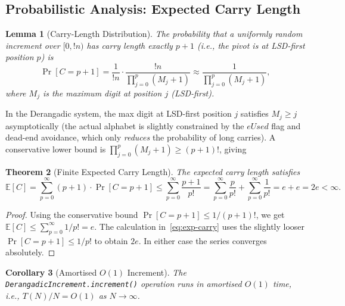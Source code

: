 \documentclass[11pt,a4paper]{article}
\newtheorem{theorem}{Theorem}[section]
\newtheorem{lemma}[theorem]{Lemma}
\newtheorem{corollary}[theorem]{Corollary}
\newcommand{\subfact}[1]{!{#1}} %
\begin{document}
    \subsection{Probabilistic Analysis: Expected Carry Length}

    \begin{lemma}[Carry-Length Distribution]
        \label{lem:carry-dist}
        The probability that a uniformly random increment over $[0, \subfact{n})$
        has carry length exactly $p+1$ (i.e., the pivot is at LSD-first position $p$)
        is
        \begin{equation}
            \Pr[C = p+1] = \frac{1}{\subfact{n}} \cdot
            \frac{\subfact{n}}{\prod_{j=0}^{p} (M_j+1)}
            \approx \frac{1}{\prod_{j=0}^{p} (M_j+1)},
            \label{eq:carry-prob}
        \end{equation}
        where $M_j$ is the maximum digit at position $j$ (LSD-first).
    \end{lemma}

    In the Derangadic system, the max digit at LSD-first position $j$ satisfies
    $M_j \geq j$ asymptotically (the actual alphabet is slightly constrained by
    the $eUsed$ flag and dead-end avoidance, which only \emph{reduces} the
    probability of long carries). A conservative lower bound is
    $\prod_{j=0}^{p} (M_j+1) \geq (p+1)!$, giving

    \begin{theorem}[Finite Expected Carry Length]
        \label{thm:expected-carry}
        The expected carry length satisfies
        \begin{equation}
            \mathbb{E}[C] = \sum_{p=0}^{\infty} (p+1) \cdot \Pr[C = p+1]
            \leq \sum_{p=0}^{\infty} \frac{p+1}{p!}
            = \sum_{p=0}^{\infty} \frac{p}{p!} + \sum_{p=0}^{\infty} \frac{1}{p!}
            = e + e = 2e < \infty.
            \label{eq:exp-carry}
        \end{equation}
    \end{theorem}

    \begin{proof}
        Using the conservative bound $\Pr[C = p+1] \leq 1/(p+1)!$, we get
        $\mathbb{E}[C] \leq \sum_{p=0}^{\infty} 1/p! = e$. The calculation
        in~\eqref{eq:exp-carry} uses the slightly looser $\Pr[C = p+1] \leq 1/p!$
        to obtain $2e$. In either case the series converges absolutely.
    \end{proof}

    \begin{corollary}[Amortised $O(1)$ Increment]
        \label{cor:amortised}
        The \texttt{DerangadicIncrement.increment()} operation runs in
        \emph{amortised} $O(1)$ time, i.e., $T(N)/N = O(1)$ as $N \to \infty$.
    \end{corollary}
\end{document}
